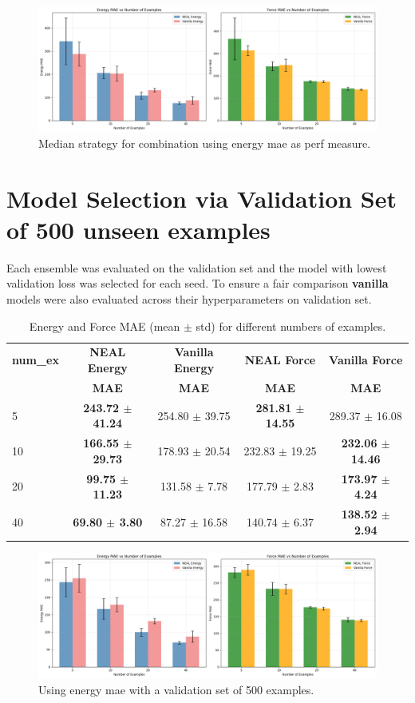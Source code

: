 \documentclass[12pt]{article}
\theoremstyle{definition}
\theoremstyle{remark}
\begin{document}
\begin{figure}[H]
    \centering
    \includegraphics[width=1.0\linewidth]{plots/plots_for_median_strategy_using_only_train_energy.png}
    \caption{Median strategy for combination using energy mae as perf measure.}
    \label{fig:placeholder}
\end{figure}
\newpage
\section{Model Selection via Validation Set of 500 unseen examples}
Each ensemble was evaluated on the validation set and the model with lowest validation loss was selected for each seed. To ensure a fair comparison \textbf{vanilla} models were also evaluated across their hyperparameters on validation set.
\begin{table}[htbp]
\centering
\small
\caption{Energy and Force MAE (mean $\pm$ std) for different numbers of examples.}
\begin{tabular}{@{}lcccc@{}}
\hline
\textbf{num\_ex} & \textbf{NEAL Energy} & \textbf{Vanilla Energy} & \textbf{NEAL Force} & \textbf{Vanilla Force} \\
& \textbf{MAE} & \textbf{MAE} & \textbf{MAE} & \textbf{MAE} \\
\hline
5  & \textbf{243.72 $\pm$ 41.24} & 254.80 $\pm$ 39.75  & \textbf{281.81 $\pm$ 14.55} & 289.37 $\pm$ 16.08 \\
10 & \textbf{166.55 $\pm$ 29.73} & 178.93 $\pm$ 20.54  & 232.83 $\pm$ 19.25 & \textbf{232.06 $\pm$ 14.46} \\
20 & \textbf{99.75 $\pm$ 11.23}  & 131.58 $\pm$ 7.78   & 177.79 $\pm$ 2.83  & \textbf{173.97 $\pm$ 4.24} \\
40 & \textbf{69.80 $\pm$ 3.80}   & 87.27 $\pm$ 16.58   & 140.74 $\pm$ 6.37  & \textbf{138.52 $\pm$ 2.94} \\
\hline
\end{tabular}
\end{table}
\begin{figure}[htbp]
    \centering
    \includegraphics[width=1.0\linewidth]{plots/validation on 500 examples using enerhy mae.png}
    \caption{Using energy mae with a validation set of 500 examples.}
    \label{fig:placeholder}
\end{figure}
\end{document}
